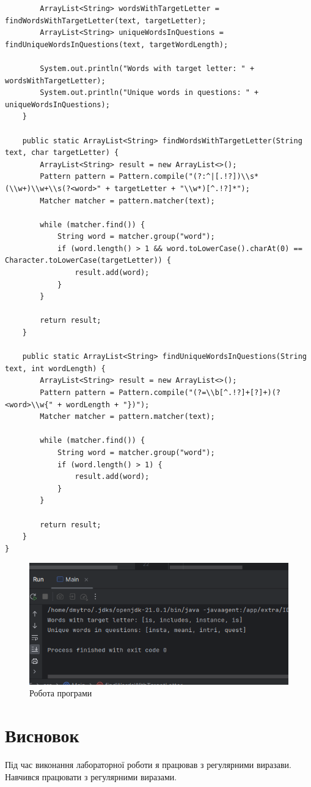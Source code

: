\documentclass[14pt]{extreport}
\begin{document}
\begin{normalsize}
\begin{lstlisting}
		ArrayList<String> wordsWithTargetLetter = findWordsWithTargetLetter(text, targetLetter);
		ArrayList<String> uniqueWordsInQuestions = findUniqueWordsInQuestions(text, targetWordLength);
		
		System.out.println("Words with target letter: " + wordsWithTargetLetter);
		System.out.println("Unique words in questions: " + uniqueWordsInQuestions);
	}
	
	public static ArrayList<String> findWordsWithTargetLetter(String text, char targetLetter) {
		ArrayList<String> result = new ArrayList<>();
		Pattern pattern = Pattern.compile("(?:^|[.!?])\\s*(\\w+)\\w+\\s(?<word>" + targetLetter + "\\w*)[^.!?]*");
		Matcher matcher = pattern.matcher(text);
		
		while (matcher.find()) {
			String word = matcher.group("word");
			if (word.length() > 1 && word.toLowerCase().charAt(0) == Character.toLowerCase(targetLetter)) {
				result.add(word);
			}
		}
		
		return result;
	}
	
	public static ArrayList<String> findUniqueWordsInQuestions(String text, int wordLength) {
		ArrayList<String> result = new ArrayList<>();
		Pattern pattern = Pattern.compile("(?=\\b[^.!?]+[?]+)(?<word>\\w{" + wordLength + "})");
		Matcher matcher = pattern.matcher(text);
		
		while (matcher.find()) {
			String word = matcher.group("word");
			if (word.length() > 1) {
				result.add(word);
			}
		}
		
		return result;
	}
}

	\end{lstlisting}	
	
	\begin{figure}[H]
		\centering
		\includegraphics[scale=0.55]{1}
		\caption{Робота програми}
	\end{figure}

	\section*{Висновок}
	Під час виконання лабораторної роботи я працював з регулярними виразави. Навчився працювати з регулярними виразами.
	 
\end{normalsize}
\end{document}
